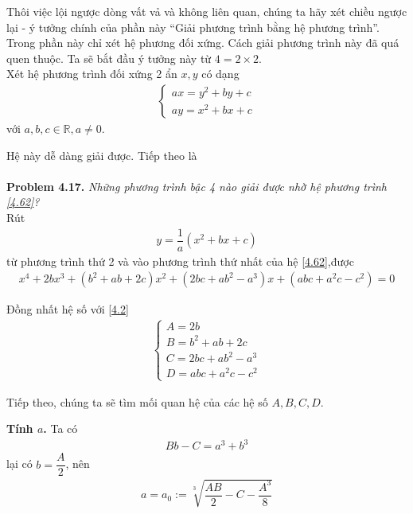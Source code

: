 \documentclass[a4paper,oneside]{book}
\numberwithin{equation}{chapter}
\begin{document}
Thôi việc lội ngược dòng vất vả và không liên quan, chúng ta hãy xét chiều ngược lại - ý tưởng chính của phần này ``Giải phương trình bằng hệ phương trình''. Trong phần này chỉ xét hệ phương đối xứng. Cách giải phương trình này đã quá quen thuộc. Ta sẽ bắt đầu ý tưởng này từ $4=2\times 2$.\\

Xét hệ phương trình đối xứng 2 ẩn $x,y$ có dạng
\begin{align}
\label{4.62}
\left\{ {\begin{array}{*{20}{c}}
{ax = {y^2} + by + c}\\
{ay = {x^2} + bx + c}
\end{array}} \right.
\end{align}
với $a,b,c \in \mathbb{R},a \ne 0$.

Hệ này dễ dàng giải được. Tiếp theo là\\
\\
\textbf{Problem 4.17.} \textit{Những phương trình bậc 4 nào giải được nhờ hệ phương trình \eqref{4.62}?}\\

Rút 
\begin{align}
y = \dfrac{1}{a}\left( {{x^2} + bx + c} \right)
\end{align}
từ phương trình thứ 2 và vào phương trình thứ nhất của hệ \eqref{4.62},được
\begin{align}
\label{4.64}
{x^4} + 2b{x^3} + \left( {{b^2} + ab + 2c} \right){x^2} + \left( {2bc + a{b^2} - {a^3}} \right)x + \left( {abc + {a^2}c - {c^2}} \right) = 0
\end{align}

Đồng nhất hệ số với \eqref{4.2} 
\begin{align}
\left\{ \begin{array}{l}
A = 2b\\
B = {b^2} + ab + 2c\\
C = 2bc + a{b^2} - {a^3}\\
D = abc + {a^2}c - {c^2}
\end{array} \right.
\end{align}

Tiếp theo, chúng ta sẽ tìm mối quan hệ của các hệ số $A,B,C,D$.

\textbf{Tính $a$.} Ta có
\begin{align}
Bb - C = {a^3} + {b^3}
\end{align}
lại có $b = \dfrac{A}{2}$, nên 
\begin{align}
a = {a_0}:=\sqrt[3]{{\dfrac{{AB}}{2} - C - \dfrac{{{A^3}}}{8}}} 
\end{align}
\end{document}
